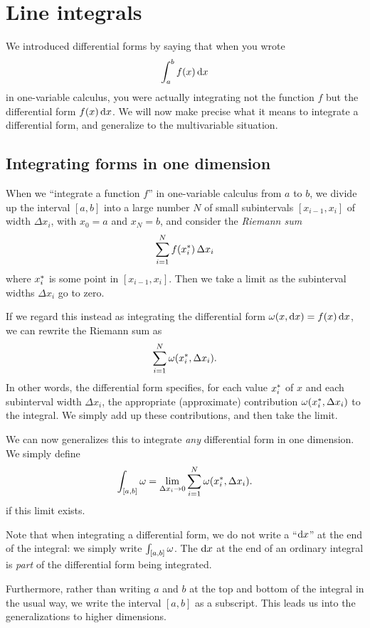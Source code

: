 \ifdefined\inmaster\else\def\subonly{\jobname}\fi

\chapter{Line integrals}
\label{cha:line-integrals}

We introduced differential forms by saying that when you wrote
\[ \itint x a b {f(x)} \]
in one-variable calculus, you were actually integrating not the function $f$ but the differential form $f(x)\,\dx$.
We will now make precise what it means to integrate a differential form, and generalize to the multivariable situation.

\section{Integrating forms in one dimension}
\label{sec:integrating-forms}

When we ``integrate a function $f$'' in one-variable calculus from $a$ to $b$, we divide up the interval $[a,b]$ into a large number $N$ of small subintervals $[x_{i-1},x_i]$ of width $\Delta x_i$, with $x_0 = a$ and $x_N=b$, and consider the \emph{Riemann sum}
\[ \sum_{i=1}^N f(\rstag x i)\, \Delta x_i \]
where $\rstag x i$ is some point in $[x_{i-1},x_i]$.
Then we take a limit as the subinterval widths $\Delta x_i$ go to zero.

If we regard this instead as integrating the differential form $\omega(x,\dx) = f(x)\, \dx$, we can rewrite the Riemann sum as
\[ \sum_{i=1}^N \omega(\rstag x i,\Delta x_i). \]
In other words, the differential form specifies, for each value $\rstag x i$ of $x$ and each subinterval width $\Delta x_i$, the appropriate (approximate) contribution $\omega(\rstag x i,\Delta x_i)$ to the integral.
We simply add up these contributions, and then take the limit.

We can now generalizes this to integrate \emph{any} differential form in one dimension.
We simply define
\[ \lint{[a,b]} \omega = \lim_{\Delta x_i \to 0} \sum_{i=1}^N \omega(\rstag x i,\Delta x_i). \]
if this limit exists.

Note that when integrating a differential form, we do not write a ``$\dx$'' at the end of the integral: we simply write $\lint{[a,b]} \omega$.
The $\dx$ at the end of an ordinary integral is \emph{part} of the differential form being integrated.

Furthermore, rather than writing $a$ and $b$ at the top and bottom of the integral in the usual way, we write the interval $[a,b]$ as a subscript.
This leads us into the generalizations to higher dimensions.

